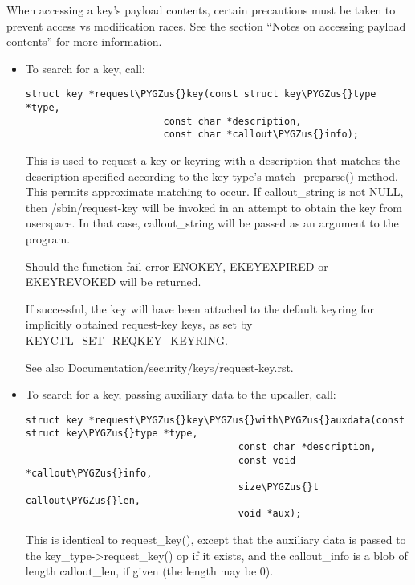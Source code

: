 \documentclass[a4paper,8pt,english]{sphinxmanual}
\def\PYGZus{\char`\_}
\begin{document}
When accessing a key's payload contents, certain precautions must be taken to
prevent access vs modification races. See the section ``Notes on accessing
payload contents'' for more information.
\begin{itemize}
\item {} 
To search for a key, call:

\begin{Verbatim}[commandchars=\\\{\}]
struct key *request\PYGZus{}key(const struct key\PYGZus{}type *type,
                        const char *description,
                        const char *callout\PYGZus{}info);
\end{Verbatim}

This is used to request a key or keyring with a description that matches
the description specified according to the key type's match\_preparse()
method. This permits approximate matching to occur. If callout\_string is
not NULL, then /sbin/request-key will be invoked in an attempt to obtain
the key from userspace. In that case, callout\_string will be passed as an
argument to the program.

Should the function fail error ENOKEY, EKEYEXPIRED or EKEYREVOKED will be
returned.

If successful, the key will have been attached to the default keyring for
implicitly obtained request-key keys, as set by KEYCTL\_SET\_REQKEY\_KEYRING.

See also Documentation/security/keys/request-key.rst.

\item {} 
To search for a key, passing auxiliary data to the upcaller, call:

\begin{Verbatim}[commandchars=\\\{\}]
struct key *request\PYGZus{}key\PYGZus{}with\PYGZus{}auxdata(const struct key\PYGZus{}type *type,
                                     const char *description,
                                     const void *callout\PYGZus{}info,
                                     size\PYGZus{}t callout\PYGZus{}len,
                                     void *aux);
\end{Verbatim}

This is identical to request\_key(), except that the auxiliary data is
passed to the key\_type-\textgreater{}request\_key() op if it exists, and the callout\_info
is a blob of length callout\_len, if given (the length may be 0).


\end{itemize}
\end{document}
